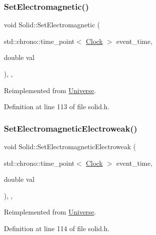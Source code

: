 \subsubsection{\texorpdfstring{Set\+Electromagnetic()}{SetElectromagnetic()}}
{\footnotesize\ttfamily void Solid\+::\+Set\+Electromagnetic (\begin{DoxyParamCaption}\item[{std\+::chrono\+::time\+\_\+point$<$ \hyperlink{universe_8h_a0ef8d951d1ca5ab3cfaf7ab4c7a6fd80}{Clock} $>$}]{event\+\_\+time,  }\item[{double}]{val }\end{DoxyParamCaption})\hspace{0.3cm}{\ttfamily [inline]}, {\ttfamily [final]}, {\ttfamily [virtual]}}



Reimplemented from \hyperlink{class_universe_aa981fc7e252b1fbbb675f0371860954d}{Universe}.



Definition at line 113 of file solid.\+h.

\mbox{\label{class_solid_a6617ae9fe4707d760a23b54eddf00dec}} 
\subsubsection{\texorpdfstring{Set\+Electromagnetic\+Electroweak()}{SetElectromagneticElectroweak()}}
{\footnotesize\ttfamily void Solid\+::\+Set\+Electromagnetic\+Electroweak (\begin{DoxyParamCaption}\item[{std\+::chrono\+::time\+\_\+point$<$ \hyperlink{universe_8h_a0ef8d951d1ca5ab3cfaf7ab4c7a6fd80}{Clock} $>$}]{event\+\_\+time,  }\item[{double}]{val }\end{DoxyParamCaption})\hspace{0.3cm}{\ttfamily [inline]}, {\ttfamily [final]}, {\ttfamily [virtual]}}



Reimplemented from \hyperlink{class_universe_a608aa95698380f791a0ffba45cc1bee3}{Universe}.



Definition at line 114 of file solid.\+h.

\mbox{\label{class_solid_ae237f2c713868c133e28ed7f75fc9125}} 
